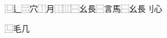 \documentclass{article}
\begin{document}
\begingroup
  ⿺辶⿳穴⿰月⿰⿲⿱幺長⿱言馬⿱幺長刂心
\endgroup

\begingroup
  ⿺毛几
\endgroup
\end{document}

